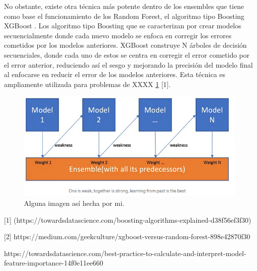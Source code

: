 \documentclass{uathesis-es}
\begin{document}
No obstante, existe otra técnica más potente dentro de los ensembles que tiene como base el funcionamiento de los Random Forest, el algoritmo tipo Boosting XGBoost \cite{Chen_2016}. Los algoritmo tipo Boosting que se caracterizan por crear modelos secuencialmente donde cada nuevo modelo se enfoca en corregir los errores cometidos por los modelos anteriores. XGBoost construye N árboles de decisión secuenciales, donde cada uno de estos se centra en corregir el error cometido por el error anterior, reduciendo así el sesgo y mejorando la precisión del modelo final al enfocarse en reducir el error de los modelos anteriores. Esta técnica es ampliamente utilizada para problemas de XXXX \ref{BoostingExample} [1].

\begin{figure}[H]
    \centering
    \includegraphics[width=14cm]{Figures/boosting_example.png}
    \caption{Alguna imagen así hecha por mi.}
    \label{BoostingExample}
\end{figure}

[1] (https://towardsdatascience.com/boosting-algorithms-explained-d38f56ef3f30)

[2] https://medium.com/geekculture/xgboost-versus-random-forest-898e42870f30


https://towardsdatascience.com/best-practice-to-calculate-and-interpret-model-feature-importance-14f0e11ee660


\end{document}
